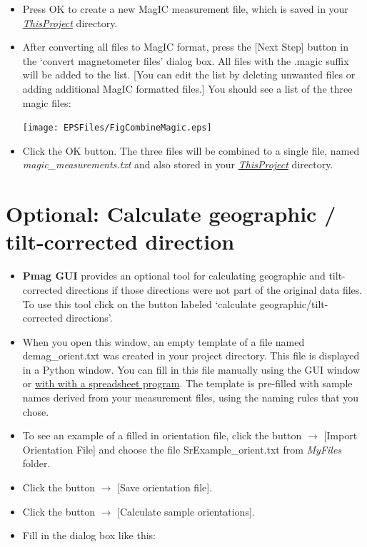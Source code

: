 \documentclass[11pt]{book}
\begin{document}
{\begin{itemize}
Your dialog boxes should look like this for the AF and thermal data:

\texttt{[image: EPSFiles/FigConvertGenericA.eps]}

and like this for the  paleointensity data.  For paleointensity data, you must also supply the lab field in micro tesla (40) and orientation relative to sample's X direction:  0 90.

\texttt{[image: EPSFiles/FigConvertGenericB.eps]}

\item Press OK to create a new MagIC measurement file, which is saved in your \href{#Project_Directory}{\it ThisProject} directory.



\item After converting all files to MagIC format, press the [Next Step] button in the `convert magnetometer files' dialog box. All files with the .magic suffix will be added to the list.  [You can edit the list by deleting unwanted files or adding additional MagIC formatted files.]   You should see a list of the three magic files:

\texttt{[image: EPSFiles/FigCombineMagic.eps]}

\item Click the OK button. The three files will be combined to a single file,  named {\it magic\_measurements.txt} and also stored  in your \href{#Project_Directory}{\it ThisProject} directory.
\end{itemize}


\section{Optional: Calculate geographic / tilt-corrected direction}
\begin{itemize}
\item {\bf Pmag GUI} provides an optional tool for calculating geographic and tilt-corrected directions if those directions were not part of the original data files. To use this tool click on the button labeled `calculate geographic/tilt-corrected directions'.

\item When you open this window, an empty template of a file named demag\_orient.txt was created in your project directory. This file is displayed in a Python window. You can fill in  this file manually using the GUI window or \href{#field_info}{with with a spreadsheet program}. The template is pre-filled with sample names derived from your measurement files, using the naming rules that you chose.
\item To see an example of a filled in orientation file, click the button $\rightarrow$ [Import Orientation File] and  choose the file SrExample\_orient.txt from {\it MyFiles} folder.
\item Click the button $\rightarrow$ [Save orientation file].
\item Click the button $\rightarrow$ [Calculate sample orientations].
\item Fill in the dialog box like this:


\end{itemize}}
\end{document}
